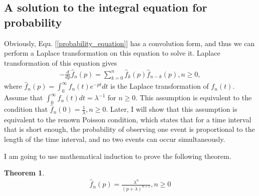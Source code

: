 \documentclass[10pt]{article}
\newtheorem{theorem}{Theorem}[section]
\numberwithin{figure}{section}
\numberwithin{equation}{section}
\begin{document}
\subsection{A solution to the integral equation for probability}
Obviously, Equ. [\ref{probability_equation}] has a convolution form, and thus we can perform a Laplace transformation on this equation to solve it. Laplace transformation of this equation gives 
\begin{eqnarray}
-\frac{d}{dp}\hat{f}_{n}(p) = \sum_{k = 0}^{n} \hat{f}_{k}(p)\hat{f}_{n - k}(p), n \ge 0, 
\end{eqnarray}
where $\hat{f}_{n}(p) = \int_{0}^{\infty} f_{n}(t) e^{-pt}dt$ is the Laplace transformation of $f_{n}(t)$. 
Assume that $\int_{0}^{\infty} f_{n}(t) dt = \lambda^{-1}$ for $n \ge 0$. This assumption is equivalent to the condition that $\hat{f}_{n}(0) = \frac{1}{\lambda}, n \ge 0$. Later, I will show that this assumption is equivalent to the renown Poisson condition, which states that for a time interval that is short enough, the probability of observing one event is proportional to the length of the time interval, and no two events can occur simultaneously. 

I am going to use mathematical induction to prove the following theorem. 
\begin{theorem}
\begin{eqnarray}
\hat{f}_{n}(p) = \frac{\lambda^n}{(p + \lambda)^{n + 1}}, n \ge 0
\end{eqnarray}
\end{theorem}
\end{document}
